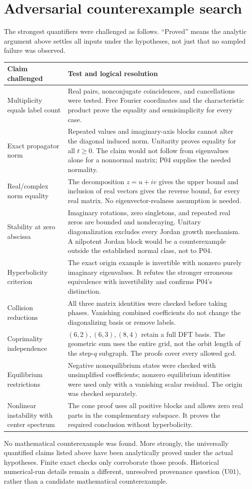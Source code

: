 \documentclass[11pt]{article}
\begin{document}
\section{Adversarial counterexample search}
The strongest quantifiers were challenged as follows. ``Proved'' means the
analytic argument above settles all inputs under the hypotheses, not just
that no sampled failure was observed.
\begin{longtable}{L{0.25\textwidth}L{0.66\textwidth}}
\toprule Claim challenged & Test and logical resolution\\\midrule\endhead
Multiplicity equals label count & Real pairs, nonconjugate coincidences, and
cancellations were tested. Free Fourier coordinates and the characteristic
product prove the equality and semisimplicity for every case.\\
Exact propagator norm & Repeated values and imaginary-axis blocks cannot
alter the diagonal induced norm. Unitarity proves equality for all $t\ge0$.
The claim would not follow from eigenvalues alone for a nonnormal matrix;
P04 supplies the needed normality.\\
Real/complex norm equality & The decomposition $z=u+iv$ gives the upper
bound and inclusion of real vectors gives the reverse bound, for every real
matrix. No eigenvector-realness assumption is needed.\\
Stability at zero abscissa & Imaginary rotations, zero singletons, and
repeated real zeros are bounded and nondecaying. Unitary diagonalization
excludes every Jordan growth mechanism. A nilpotent Jordan block would be
a counterexample outside the established normal class, not to P04.\\
Hyperbolicity criterion & The exact origin example is invertible with
nonzero purely imaginary eigenvalues. It refutes the stronger erroneous
equivalence with invertibility and confirms P04's distinction.\\
Collision reductions & All three matrix identities were checked before
taking phases. Vanishing combined coefficients do not change the diagonalizing
basis or remove labels.\\
Coprimality independence & $(6,2),(6,3),(8,4)$ retain a full DFT basis.
The geometric sum uses the entire grid, not the orbit length of the
step-$q$ subgraph. The proofs cover every allowed gcd.\\
Equilibrium restrictions & Negative nonequilibrium states were checked with
unsimplified coefficients; nonzero equilibrium identities were used only
with a vanishing scalar residual. The origin was checked separately.\\
Nonlinear instability with center spectrum & The cone proof uses all
positive blocks and allows zero real parts in the complementary subspace.
It proves the required conclusion without hyperbolicity.\\
\bottomrule
\end{longtable}
No mathematical counterexample was found. More strongly, the universally
quantified claims listed above have been analytically proved under the
actual hypotheses. Finite exact checks only corroborate those proofs.
Historical numerical-run details remain a different, unresolved provenance
question (U01), rather than a candidate mathematical counterexample.
\end{document}

